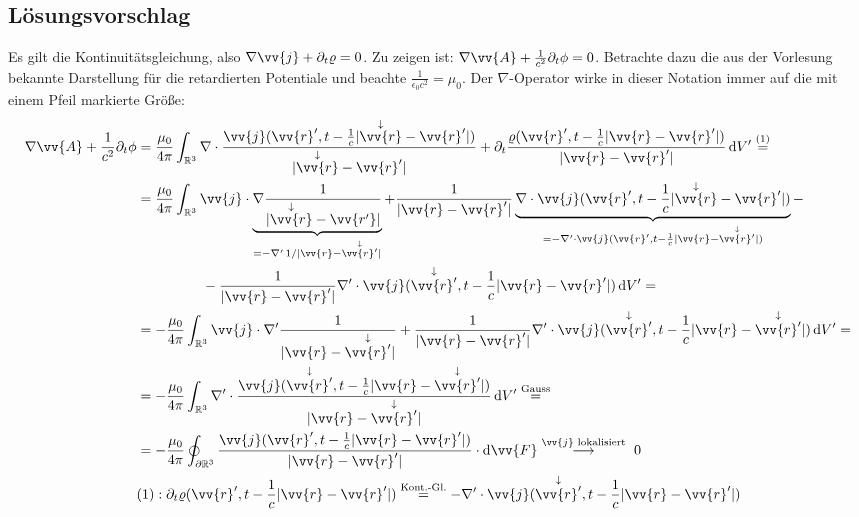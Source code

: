 \documentclass[a4paper,12pt]{article}
\begin{document}
\subsection*{Lösungsvorschlag}
Es gilt die Kontinuitätsgleichung, also $\nabla\vv{j}+\partial_t\varrho=0$. Zu zeigen ist: $\nabla\vv{A}+\frac{1}{c^2}\partial_t\phi=0$. Betrachte dazu die aus der Vorlesung bekannte Darstellung für die retardierten Potentiale und beachte $\frac{1}{\epsilon_0 c^2}=\mu_0$. Der $\nabla$-Operator wirke in dieser Notation immer auf die mit einem Pfeil markierte Größe:
\begin{align*}
\nabla\vv{A}+\frac{1}{c^2}\partial_t\phi&=\frac{\mu_0}{4\pi}\int_{\mathbb{R}^3}\nabla\cdot\frac{\vv{j}(\vv{r}',t-\frac{1}{c}|\overset{\downarrow}{\vv{r}}-\vv{r}'|)}{|\overset{\downarrow}{\vv{r}}-\vv{r}'|}+\partial_t\frac{\varrho(\vv{r}',t-\frac{1}{c}|\vv{r}-\vv{r}'|)}{|\vv{r}-\vv{r}'|}\,\textrm{d}V'\overset{(1)}{=}\\
&=\frac{\mu_0}{4\pi}\int_{\mathbb{R}^3}\vv{j}\cdot\underbrace{\nabla\frac{1}{|\overset{\downarrow}{\vv{r}}-\vv{r'}|}}_{=-\nabla'\, 1/|\vv{r}-\overset{\downarrow}{\vv{r}'}|}+\frac{1}{|\vv{r}-\vv{r}'|}\underbrace{\nabla\cdot\vv{j}(\vv{r}',t-\frac{1}{c}|\overset{\downarrow}{\vv{r}}-\vv{r}'|)}_{=-\nabla'\cdot\vv{j}(\vv{r}', t-\frac{1}{c}|\vv{r}-\overset{\downarrow}{\vv{r}'}|)}-\\
&\ \ \ \ \ \ \ \ \ \ \ \ \ \ -\frac{1}{|\vv{r}-\vv{r}'|}\nabla'\cdot\vv{j}(\overset{\downarrow}{\vv{r}'},t-\frac{1}{c}|\vv{r}-\vv{r}'|)\,\textrm{d}V'= \\
&=-\frac{\mu_0}{4\pi}\int_{\mathbb{R}^3}\vv{j}\cdot\nabla'\frac{1}{|\vv{r}-\overset{\downarrow}{\vv{r}'}|}+\frac{1}{|\vv{r}-\vv{r}'|}\nabla'\cdot\vv{j}(\overset{\downarrow}{\vv{r}'},t-\frac{1}{c}|\vv{r}-\overset{\downarrow}{\vv{r}'}|)\,\textrm{d}V'= \\
&=-\frac{\mu_0}{4\pi}\int_{\mathbb{R}^3}\nabla'\cdot\frac{\vv{j}(\overset{\downarrow}{\vv{r}'},t-\frac{1}{c}|\vv{r}-\overset{\downarrow}{\vv{r}'}|)}{|\vv{r}-\overset{\downarrow}{\vv{r}'}|}\,\textrm{d}V'\overset{\textrm{Gauss}}{=}\\
&=-\frac{\mu_0}{4\pi}\oint_{\partial{\mathbb{R}^3}}\frac{\vv{j}(\vv{r}',t-\frac{1}{c}|\vv{r}-\vv{r}'|)}{|\vv{r}-\vv{r}'|}\cdot\textrm{d}\vv{F}\overset{\vv{j} \textrm{ lokalisiert}}{\longrightarrow}\ 0 \\
&(1):\partial_t\varrho(\vv{r}', t-\frac{1}{c}|\vv{r}-\vv{r}'|)\overset{\textrm{Kont.-Gl.}}{=}-\nabla'\cdot\vv{j}(\overset{\downarrow}{\vv{r}'}, t-\frac{1}{c}|\vv{r}-\vv{r}'|)
\end{align*}
\end{document}
